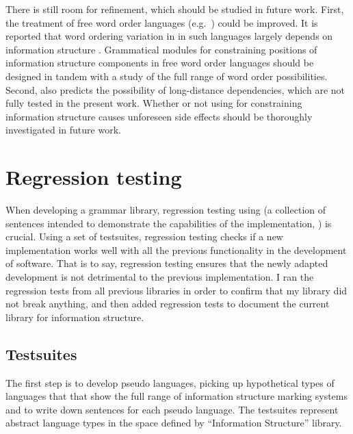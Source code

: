 There is still room for refinement, which should be studied in future
work.  First, the treatment of free word order languages
(e.g.\ ) could be improved.  It is reported that word
ordering variation in in such languages largely depends on information
structure \citep{rodionova:01}.  Grammatical modules for constraining
positions of information structure components in free word order
languages should be designed in tandem with a study of the full range
of word order possibilities. Second,  also predicts
the possibility of long-distance dependencies, which are not fully
tested in the present work. Whether or not using  for
constraining information structure causes unforeseen side effects
should be thoroughly investigated in future work.








\section{Regression testing}
\label{13:sec:pseudo}


When developing a grammar library, regression testing using
 (a collection of sentences intended to demonstrate
the capabilities of the implementation, \citealt{bender:etal:07}) is crucial. 
Using a set of testsuites, regression testing
checks if a new implementation works well with all the previous
functionality in the development of software.  That is to say,
regression testing ensures that the newly adapted development is not
detrimental to the previous implementation.  I ran the regression
tests from all previous libraries in order to confirm that my library
did not break anything, and then added regression tests to document
the current library for information structure.





\subsection{Testsuites}
\label{13:ssec:testsuites}


The first step is to develop pseudo languages, picking up hypothetical
types of languages that that show the full range of information
structure marking systems and to write down sentences for each pseudo
language. The testsuites represent abstract language types in the
space defined by ``Information Structure'' library.


